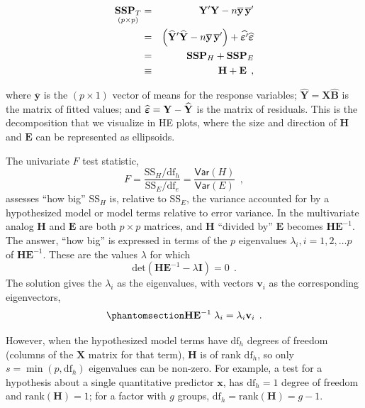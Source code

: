 \documentclass[
  letterpaper,
  10pt,
  krantz2]{krantz}
\begin{document}
\begin{align*}
\underset{(p\times p)}{\mathbf{SSP}_{T}}
& = & \mathbf{Y}^{\prime} \mathbf{Y} - n \overline{\mathbf{y}}\,\overline{\mathbf{y}}^{\prime} \\
& = & \left(\widehat {\mathbf{Y}}^{\prime}\widehat{\mathbf{Y}} - n\overline{\mathbf{y}}\,\overline{\mathbf{y}}^{\prime} \right) + \widehat{\boldsymbol{\Large\varepsilon}^{\prime}}\widehat{\boldsymbol{\Large\varepsilon}} \\
& = &  \mathbf{SSP}_{H} + \mathbf{SSP}_{E} \\
& \equiv & \mathbf{H} + \mathbf{E} \:\: ,
\end{align*}

where \(\overline{\mathbf{y}}\) is the \((p\times 1)\) vector of means
for the response variables;
\(\widehat{\mathbf{Y}} = \mathbf{X}\widehat{\mathbf{B}}\) is the matrix
of fitted values; and
\(\widehat{\boldsymbol{\Large\varepsilon}} = \mathbf{Y} -\widehat{\mathbf{Y}}\)
is the matrix of residuals. This is the decomposition that we visualize
in HE plots, where the size and direction of \(\mathbf{H}\) and
\(\mathbf{E}\) can be represented as ellipsoids.

The univariate \(F\) test statistic,
\[F = \frac{\text{SS}_H/\text{df}_h}{\text{SS}_E/\text{df}_e} = \frac{\mathsf{Var}(H)}{\mathsf{Var}(E)} \:\: ,
\] assesses ``how big'' \(\text{SS}_H\) is, relative to \(\text{SS}_E\),
the variance accounted for by a hypothesized model or model terms
relative to error variance. In the multivariate analog \(\mathbf{H}\)
and \(\mathbf{E}\) are both \(p \times p\) matrices, and \(\mathbf{H}\)
``divided by'' \(\mathbf{E}\) becomes \(\mathbf{H}\mathbf{E}^{-1}\). The
answer, ``how big'' is expressed in terms of the \(p\) eigenvalues
\(\lambda_i, i = 1, 2, \dots p\) of \(\mathbf{H}\mathbf{E}^{-1}\). These
are the values \(\lambda\) for which \[
\mathrm{det}(\mathbf{H}\mathbf{E}^{-1} - \lambda \mathbf{I}) = 0 \:\: .
\] The solution gives the \(\lambda_i\) as the eigenvalues, with vectors
\(\mathbf{v}_i\) as the corresponding eigenvectors,
\begin{equation}\phantomsection\label{eq-he-eigen}{
\mathbf{H}\mathbf{E}^{-1} \; \lambda_i = \lambda_i \mathbf{v}_i \:\: .
}\end{equation}

However, when the hypothesized model terms have \(\text{df}_h\) degrees
of freedom (columns of the \(\mathbf{X}\) matrix for that term),
\(\mathbf{H}\) is of rank \(\text{df}_h\), so only
\(s=\min(p, \text{df}_h)\) eigenvalues can be non-zero. For example, a
test for a hypothesis about a single quantitative predictor
\(\mathbf{x}\), has \(\text{df}_h = 1\) degree of freedom and
\(\mathrm{rank} (\mathbf{H}) = 1\); for a factor with \(g\) groups,
\(\text{df}_h = \mathrm{rank} (\mathbf{H}) = g-1\).
\end{document}
